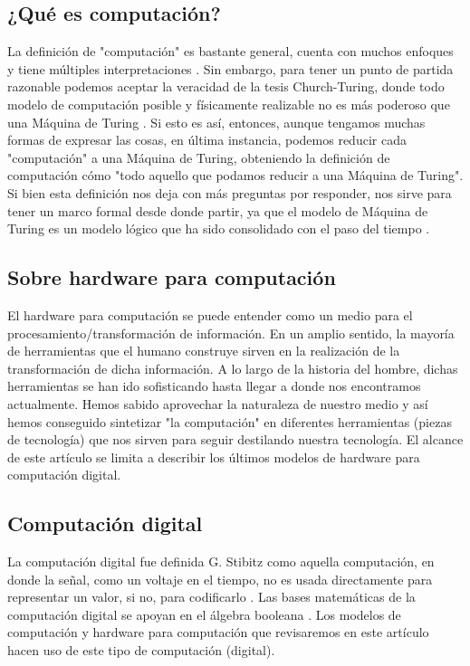\documentclass[conference]{IEEEtran}
\begin{document}
\subsection{¿Qué es computación?}
La definición de "computación" es bastante general, cuenta con muchos enfoques y tiene múltiples interpretaciones \cite{turing2009computing}. Sin embargo, para tener un punto de partida razonable podemos aceptar la veracidad de la tesis Church-Turing, donde todo modelo de computación posible y físicamente realizable no es más poderoso que una Máquina de Turing \cite{Ben-amram06thechurch-turing}\cite{eberbach2004turing}. Si esto es así, entonces, aunque tengamos muchas formas de expresar las cosas, en última instancia, podemos reducir cada "computación" a una Máquina de Turing, obteniendo la definición de computación cómo "todo aquello que podamos reducir a una Máquina de Turing". Si bien esta definición nos deja con más preguntas por responder, nos sirve para tener un marco formal desde donde partir, ya que el modelo de Máquina de Turing es un modelo lógico que ha sido consolidado con el paso del tiempo \cite{arora2009computational}.

\subsection{Sobre hardware para computación}
El hardware para computación se puede entender como un medio para el procesamiento/transformación de información. En un amplio sentido, la mayoría de herramientas que el humano construye sirven en la realización de la transformación de dicha información. A lo largo de la historia del hombre, dichas herramientas se han ido sofisticando hasta llegar a donde nos encontramos actualmente. Hemos sabido aprovechar la naturaleza de nuestro medio y así hemos conseguido sintetizar "la computación" en diferentes herramientas (piezas de tecnología) que nos sirven para seguir destilando nuestra tecnología. El alcance de este artículo se limita a describir los últimos modelos de hardware para computación digital.

\subsection{Computación digital}
La computación digital fue definida G. Stibitz como aquella computación, en donde la señal, como un voltaje en el tiempo, no es usada directamente para representar un valor, si no, para codificarlo \cite{dennhardt2014}. Las bases matemáticas de la computación digital se apoyan en el álgebra booleana \cite{shannon1938}. Los modelos de computación y hardware para computación que revisaremos en este artículo hacen uso de este tipo de computación (digital).
\end{document}

